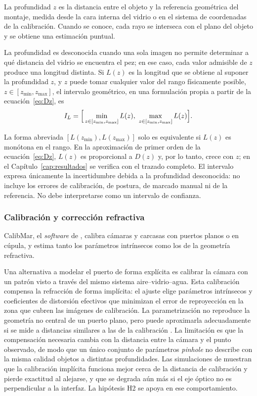 La profundidad $z$ es la distancia entre el objeto y la referencia geométrica del montaje, medida desde la cara interna del vidrio o en el sistema de coordenadas de la calibración. Cuando se conoce, cada rayo se interseca con el plano del objeto y se obtiene una estimación puntual.

La profundidad es desconocida cuando una sola imagen no permite determinar a qué distancia del vidrio se encuentra el pez; en ese caso, cada valor admisible de $z$ produce una longitud distinta. Si $L(z)$ es la longitud que se obtiene al suponer la profundidad $z$, y $z$ puede tomar cualquier valor del rango físicamente posible, $z \in [z_{\min}, z_{\max}]$, el intervalo geométrico, en una formulación propia a partir de la ecuación~\eqref{eq:Dz}, es
\begin{equation}
I_L = \Big[\min_{z \in [z_{\min}, z_{\max}]} L(z),\ \max_{z \in [z_{\min}, z_{\max}]} L(z)\Big].
\label{eq:IL}
\end{equation}

La forma abreviada $[L(z_{\min}), L(z_{\max})]$ solo es equivalente si $L(z)$ es monótona en el rango. En la aproximación de primer orden de la ecuación~\eqref{eq:Dz}, $L(z)$ es proporcional a $D(z)$ y, por lo tanto, crece con $z$; en el Capítulo~\ref{cap:resultados} se verifica con el trazado completo. El intervalo expresa únicamente la incertidumbre debida a la profundidad desconocida: no incluye los errores de calibración, de postura, de marcado manual ni de la referencia. No debe interpretarse como un intervalo de confianza.

\subsubsection{Calibración y corrección refractiva}
\label{sec:calibracion-implicita}

CalibMar, el \emph{software} de \textcite{Seegraber2025}, calibra cámaras y carcasas con puertos planos o en cúpula, y estima tanto los parámetros intrínsecos como los de la geometría refractiva.

Una alternativa a modelar el puerto de forma explícita es calibrar la cámara con un patrón visto a través del mismo sistema aire--vidrio--agua. Esta calibración compensa la refracción de forma implícita: el ajuste elige parámetros intrínsecos y coeficientes de distorsión efectivos que minimizan el error de reproyección en la zona que cubren las imágenes de calibración. La parametrización no reproduce la geometría no central de un puerto plano, pero puede aproximarla adecuadamente si se mide a distancias similares a las de la calibración \parencite{JordtSedlazeck2012,Treibitz2012,Shortis2015}. La limitación es que la compensación necesaria cambia con la distancia entre la cámara y el punto observado, de modo que un único conjunto de parámetros \emph{pinhole} no describe con la misma calidad objetos a distintas profundidades. Las simulaciones de \textcite{Rofallski2022} muestran que la calibración implícita funciona mejor cerca de la distancia de calibración y pierde exactitud al alejarse, y que se degrada aún más si el eje óptico no es perpendicular a la interfaz. La hipótesis H2 se apoya en ese comportamiento.

